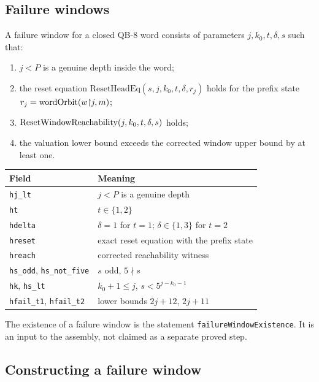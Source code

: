 \subsection{Failure windows}

\begin{definition}\label{def:failure-window}
A failure window for a closed QB-8 word consists of parameters
$j,k_0,t,\delta,s$ such that:
\begin{enumerate}[leftmargin=*]
\item $j<P$ is a genuine depth inside the word;
\item the reset equation
  $\mathrm{ResetHeadEq}(s,j,k_0,t,\delta,r_j)$ holds for the prefix
  state $r_j=\mathrm{wordOrbit}(w{\upharpoonright}j,m)$;
\item $\mathrm{ResetWindowReachability}(j,k_0,t,\delta,s)$ holds;
\item the valuation lower bound exceeds the corrected window upper
  bound by at least one.
\end{enumerate}
\end{definition}

\begin{center}
\small
\begin{tabular}{@{}p{}p{}@{}}
\toprule
Field & Meaning \\
\midrule
\texttt{hj\_lt} & $j<P$ is a genuine depth \\
\texttt{ht} & $t\in\{1,2\}$ \\
\texttt{hdelta} & $\delta=1$ for $t=1$; $\delta\in\{1,3\}$ for $t=2$ \\
\texttt{hreset} & exact reset equation with the prefix state \\
\texttt{hreach} & corrected reachability witness \\
\texttt{hs\_odd}, \texttt{hs\_not\_five} & $s$ odd, $5\nmid s$ \\
\texttt{hk}, \texttt{hs\_lt} & $k_0+1\le j$, $s<5^{j-k_0-1}$ \\
\texttt{hfail\_t1}, \texttt{hfail\_t2} & lower bounds $2j+12$, $2j+11$ \\
\bottomrule
\end{tabular}
\end{center}

The existence of a failure window is the statement
\texttt{failureWindowExistence}.  It is an input to the assembly, not
claimed as a separate proved step.

\subsection{Constructing a failure window}

